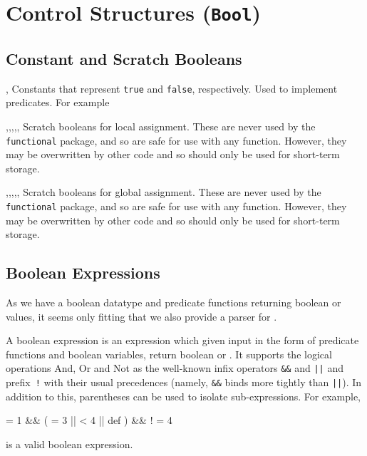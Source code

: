 \documentclass[oneside]{book}
\begin{document}
\chapter{Control Structures (\texttt{Bool})}

\section{Constant and Scratch Booleans}

\begin{variable}{\cTrueBool,\cFalseBool}
Constants that represent \verb|true| and \verb|false|, respectively. Used to
implement predicates. For example
\begin{demohigh}
\BoolVarIfTF {} {}
\BoolVarIfTF {} {}
\end{demohigh}
\end{variable}

\begin{variable}{\lTmpaBool,\lTmpbBool,\lTmpcBool,\lTmpiBool,\lTmpjBool,\lTmpkBool}
Scratch booleans for local assignment. These are never used by
the \verb!functional! package, and so are safe for use with any
function. However, they may be overwritten by other
code and so should only be used for short-term storage.
\end{variable}

\begin{variable}{\gTmpaBool,\gTmpbBool,\gTmpcBool,\gTmpiBool,\gTmpjBool,\gTmpkBool}
Scratch booleans for global assignment. These are never used by
the \verb!functional! package, and so are safe for use with any
function. However, they may be overwritten by other
code and so should only be used for short-term storage.
\end{variable}

\section{Boolean Expressions}

As we have a boolean datatype and predicate functions returning
boolean  or  values, it seems only fitting
that we also provide a parser for .

A boolean expression is an expression which given input in the form
of predicate functions and boolean variables, return boolean
 or . It supports the logical operations And,
Or and Not as the well-known infix operators \verb|&&| and \verb"||" and
prefix~\verb|!| with their usual precedences (namely, \verb|&&| binds
more tightly than \verb"||"). In addition to this, parentheses can be
used to isolate sub-expressions. For example,
\begin{codehigh}
 = {1} &&
  (
     = {3} ||
     < {4} ||
     {def}
  ) &&
!  = {4}
\end{codehigh}
is a valid boolean expression.
\end{document}
